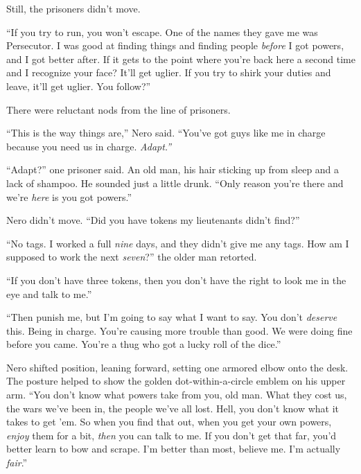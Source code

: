 Still, the prisoners didn't move.



``If you try to run, you won't escape.  One of the names they gave me was Persecutor.  I was good at finding things and finding people \emph{before} I got powers, and I got better after.  If it gets to the point where you're back here a second time and I recognize your face?  It'll get uglier.  If you try to shirk your duties and leave, it'll get uglier.  You follow?''



There were reluctant nods from the line of prisoners.



``This is the way things are,'' Nero said.  ``You've got guys like me in charge because you need us in charge.  \emph{Adapt.''}



``Adapt?'' one prisoner said.  An old man, his hair sticking up from sleep and a lack of shampoo.  He sounded just a little drunk.  ``Only reason you're there and we're \emph{here} is you got powers.''



Nero didn't move.  ``Did you have tokens my lieutenants didn't find?''



``No tags.  I worked a full \emph{nine} days, and they didn't give me any tags.  How am I supposed to work the next \emph{seven}?'' the older man retorted.



``If you don't have three tokens, then you don't have the right to look me in the eye and talk to me.''



``Then punish me, but I'm going to say what I want to say.  You don't \emph{deserve }this.  Being in charge.  You're causing more trouble than good.  We were doing fine before you came.  You're a thug who got a lucky roll of the dice.''



Nero shifted position, leaning forward, setting one armored elbow onto the desk.  The posture helped to show the golden dot-within-a-circle emblem on his upper arm.  ``You don't know what powers take from you, old man.  What they cost us, the wars we've been in, the people we've all lost.  Hell, you don't know what it takes to get 'em.  So when you find that out, when you get your own powers, \emph{enjoy} them for a bit, \emph{then} you can talk to me.  If you don't get that far, you'd better learn to bow and scrape.  I'm better than most, believe me.  I'm actually \emph{fair}.''



